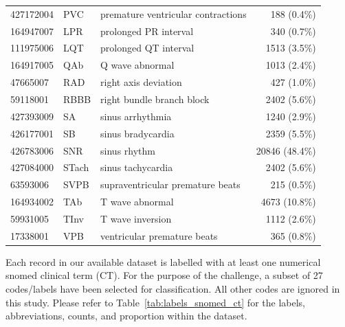 \documentclass[\main/thesis.tex]{subfiles}
\begin{document}
\begin{table}[t]
{\begin{tabular}{@{}ll@{}l@{}r@{}}
    427172004 & PVC & premature ventricular contractions & 188 (0.4\%) \\
    164947007 & LPR & prolonged PR interval & 340 (0.7\%) \\
    111975006 & LQT & prolonged QT interval & 1513 (3.5\%) \\
    164917005 & QAb & Q wave abnormal & 1013 (2.4\%) \\
    47665007 & RAD & right axis deviation & 427 (1.0\%) \\
    59118001 & RBBB & right bundle branch block & 2402 (5.6\%) \\
    427393009 & SA & sinus arrhythmia & 1240 (2.9\%) \\
    426177001 & SB & sinus bradycardia & 2359 (5.5\%) \\
    426783006 & SNR & sinus rhythm & 20846 (48.4\%)  \\
    427084000 & STach & sinus tachycardia & 2402 (5.6\%) \\
    63593006 & SVPB & supraventricular premature beats & 215 (0.5\%) \\
    164934002 & TAb & T wave abnormal & 4673 (10.8\%)  \\
    59931005 & TInv & T wave inversion & 1112 (2.6\%) \\
    17338001 & VPB & ventricular premature beats & 365 (0.8\%) \\ \hline
    \end{tabular}}
\end{table}

Each record in our available dataset is labelled with at least one numerical \gls{snomed} clinical term (CT).
For the purpose of the challenge, a subset of 27 codes/labels have been selected for classification.
All other codes are ignored in this study.
Please refer to Table~\ref{tab:labels_snomed_ct} for the labels, abbreviations, counts, and proportion within the dataset.
\end{document}

